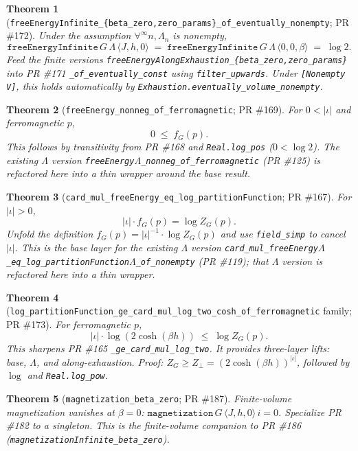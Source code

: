 \documentclass[a4paper,11pt]{article}
\newtheorem{theorem}{Theorem}
\newcommand{\LeanLambda}{\texorpdfstring{\ensuremath{\Lambda}}{Lambda}}
\begin{document}
\begin{theorem}[\texttt{freeEnergyInfinite\_\{beta\_zero,zero\_params\}\_of\_eventually\_nonempty}; PR \#172]
Under the assumption $\forall^\infty n, \Lambda_n$ is nonempty,
\[
  \texttt{freeEnergyInfinite}\,G\,\Lambda\,\langle J, h, 0\rangle
    \;=\; \texttt{freeEnergyInfinite}\,G\,\Lambda\,\langle 0, 0, \beta\rangle
    \;=\; \log 2.
\]
Feed the finite versions
\texttt{freeEnergyAlongExhaustion\_\{beta\_zero,zero\_params\}}
into PR \#171 \texttt{\_of\_eventually\_const} using
\texttt{filter\_upwards}. Under \texttt{[Nonempty V]}, this holds
automatically by \texttt{Exhaustion.eventually\_volume\_nonempty}.
\end{theorem}

\begin{theorem}[\texttt{freeEnergy\_nonneg\_of\_ferromagnetic}; PR \#169]
For $0 < |\iota|$ and ferromagnetic $p$,
\[
  0 \;\le\; f_G(p).
\]
This follows by transitivity from PR \#168 and \texttt{Real.log\_pos}
($0 < \log 2$). The existing $\Lambda$ version
\texttt{freeEnergy\LeanLambda\_nonneg\_of\_ferromagnetic} (PR \#125) is refactored
here into a thin wrapper around the base result.
\end{theorem}

\begin{theorem}[\texttt{card\_mul\_freeEnergy\_eq\_log\_partitionFunction}; PR \#167]
For $|\iota| > 0$,
\[
  |\iota| \cdot f_G(p) = \log Z_G(p).
\]
Unfold the definition $f_G(p) = |\iota|^{-1} \cdot \log Z_G(p)$
and use \texttt{field\_simp} to cancel $|\iota|$. This is the base layer for
the existing $\Lambda$ version
\texttt{card\_mul\_freeEnergy\LeanLambda\_eq\_log\_partitionFunction\LeanLambda\_of\_nonempty}
(PR \#119); that $\Lambda$ version is refactored here into a thin wrapper.
\end{theorem}

\begin{theorem}[\texttt{log\_partitionFunction\_ge\_card\_mul\_log\_two\_cosh\_of\_ferromagnetic} family; PR \#173]
For ferromagnetic $p$,
\[
  |\iota| \cdot \log(2 \cosh(\beta h)) \;\le\; \log Z_G(p).
\]
This sharpens PR \#165 \texttt{\_ge\_card\_mul\_log\_two}. It provides
three-layer lifts: base, $\Lambda$, and along-exhaustion. Proof:
$Z_G \ge Z_\bot = (2 \cosh(\beta h))^{|\iota|}$, followed by $\log$ and
\texttt{Real.log\_pow}.
\end{theorem}

\begin{theorem}[\texttt{magnetization\_beta\_zero}; PR \#187]
Finite-volume magnetization vanishes at $\beta = 0$:
$\texttt{magnetization}\,G\,\langle J, h, 0\rangle\,i = 0$.
Specialize PR \#182 to a singleton. This is the finite-volume companion to
PR \#186 (\texttt{magnetizationInfinite\_beta\_zero}).
\end{theorem}
\end{document}
